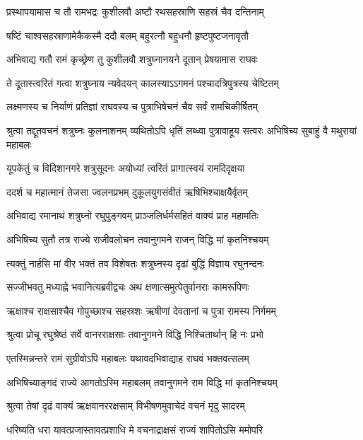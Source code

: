 \twolineshloka
{प्रस्थापयामास च तौ रामभद्रः कुशीलवौ}
{अष्टौ रथसहस्राणि सहस्रं चैव दन्तिनाम्} %

\twolineshloka
{षष्टिं चाश्वसहस्राणामेकैकस्मै ददौ बलम्}
{बहुरत्नौ बहुधनौ हृष्टपुष्टजनावृतौ} %

\twolineshloka
{अभिवाद्य गतौ रामं कृच्छ्रेण तु कुशीलवौ}
{शत्रुघ्नानयने दूतान् प्रेषयामास राघवः} %

\twolineshloka
{ते दूतास्त्वरितं गत्वा शत्रुघ्नाय न्यवेदयन्}
{कालस्याऽऽगमनं पश्चादत्रिपुत्रस्य चेष्टितम्} %

\twolineshloka
{लक्ष्मणस्य च निर्याणं प्रतिज्ञां राघवस्य च}
{पुत्राभिषेचनं चैव सर्वं रामचिकीर्षितम्} %

\threelineshloka
{श्रुत्वा तद्दूतवचनं शत्रुघ्नः कुलनाशनम्}
{व्यथितोऽपि धृतिं लब्ध्वा पुत्रावाहूय सत्वरः}
{अभिषिच्य सुबाहुं वै मथुरायां महाबलः} %

\twolineshloka
{यूपकेतुं च विदिशानगरे शत्रुसूदनः}
{अयोध्यां त्वरितं प्रागात्स्वयं रामदिदृक्षया} %

\twolineshloka
{ददर्श च महात्मानं तेजसा ज्वलनप्रभम्}
{दुकूलयुगसंवीतं ऋषिभिश्चाक्षयैर्वृतम्} %

\twolineshloka
{अभिवाद्य रमानाथं शत्रुघ्नो रघुपुङ्गवम्}
{प्राञ्जलिर्धर्मसहितं वाक्यं प्राह महामतिः} %

\twolineshloka
{अभिषिच्य सुतौ तत्र राज्ये राजीवलोचन}
{तवानुगमने राजन् विद्धि मां कृतनिश्चयम्} %

\twolineshloka
{त्यक्तुं नार्हसि मां वीर भक्तं तव विशेषतः}
{शत्रुघ्नस्य दृढां बुद्धिं विज्ञाय रघुनन्दनः} %

\twolineshloka
{सज्जीभवतु मध्याह्ने भवानित्यब्रवीद्वचः}
{अथ क्षणात्समुत्पेतुर्वानराः कामरूपिणः} %

\twolineshloka
{ऋक्षाश्च राक्षसाश्चैव गोपुच्छाश्च सहस्रशः}
{ऋषीणां देवतानां च पुत्रा रामस्य निर्गमम्} %

\twolineshloka
{श्रुत्वा प्रोचू रघुश्रेष्ठं सर्वे वानरराक्षसाः}
{तवानुगमने विद्धि निश्चितार्थान् हि नः प्रभो} %

\twolineshloka
{एतस्मिन्नन्तरे रामं सुग्रीवोऽपि महाबलः}
{यथावदभिवाद्याह राघवं भक्तवत्सलम्} %

\twolineshloka
{अभिषिच्याङ्गदं राज्ये आगतोऽस्मि महाबलम्}
{तवानुगमने राम विद्धि मां कृतनिश्चयम्} %

\twolineshloka
{श्रुत्वा तेषां दृढं वाक्यं ऋक्षवानररक्षसाम्}
{विभीषणमुवाचेदं वचनं मृदु सादरम्} %

\twolineshloka
{धरिष्यति धरा यावत्प्रजास्तावत्प्रशाधि मे}
{वचनाद्राक्षसं राज्यं शापितोऽसि ममोपरि} %

